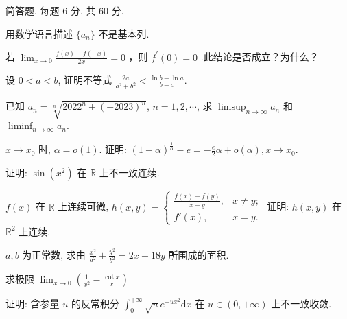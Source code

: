 \par{}
简答题. 每题 6 分, 共 60 分.\par
用数学语言描述 $\{a_{n}\}$ 不是基本列.\par
若 $\lim_{x\to 0}\frac{f(x) - f(-x)}{2x} = 0$ ，则 $f^{\prime}(0) = 0$ .此结论是否成立？为什么？\par
设 $0 < a < b$, 证明不等式 $\frac{2a}{a^2 + b^2} < \frac{\ln b - \ln a}{b - a}$.\par
已知 $a_{n} = \sqrt[n]{2022^{n} + (-2023)^{n}}$, $n = 1, 2, \cdots$, 求 $\limsup_{n \to \infty} a_{n}$ 和 $\liminf_{n \to \infty} a_{n}$.\par
$x \to x_0$ 时, $\alpha = o(1)$. 证明: $(1 + \alpha)^{\frac{1}{\alpha}} - e = -\frac{e}{2}\alpha + o(\alpha), x \to x_0$.\par
证明: $\sin (x^2)$ 在 $\mathbb{R}$ 上不一致连续.\par
$f(x)$ 在 $\mathbb{R}$ 上连续可微, $h(x,y) = \begin{cases} \frac{f(x) - f(y)}{x - y}, & x \neq y; \\ f'(x), & x = y. \end{cases}$ 证明: $h(x,y)$ 在 $\mathbb{R}^2$ 上连续.\par
$a, b$ 为正常数, 求由 $\frac{x^2}{a^2} + \frac{y^2}{b^2} = 2x + 18y$ 所围成的面积.\par
求极限 $\lim_{x\to 0}\left(\frac{1}{x^2} -\frac{\cot x}{x}\right)$\par
证明: 含参量 $u$ 的反常积分 $\int_{0}^{+\infty} \sqrt{u} e^{-ux^2} \mathrm{d}x$ 在 $u \in (0, +\infty)$ 上不一致收敛.\par
\par{}
